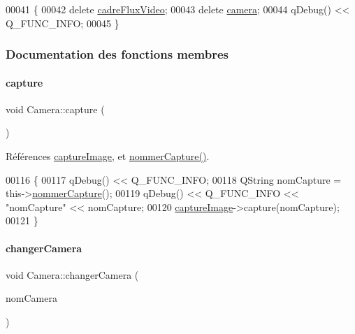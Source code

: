 \begin{DoxyCode}
00041 \{
00042     \textcolor{keyword}{delete} \hyperlink{class_camera_abf5fd38d19f0f06dfd7ec9e37f73adb8}{cadreFluxVideo};
00043     \textcolor{keyword}{delete} \hyperlink{class_camera_a282a199ddd33fe64bc27b32a55719054}{camera};
00044     qDebug() << Q\_FUNC\_INFO;
00045 \}
\end{DoxyCode}


\subsubsection{Documentation des fonctions membres}
\mbox{\label{class_camera_a3ca730dcbd7ea6bfba12931a15066f6c}} 
\paragraph{\texorpdfstring{capture}{capture}}
{\footnotesize\ttfamily void Camera\+::capture (\begin{DoxyParamCaption}{ }\end{DoxyParamCaption})\hspace{0.3cm}{\ttfamily [slot]}}



Références \hyperlink{class_camera_a482276c4fd0ba7172670006556322b62}{capture\+Image}, et \hyperlink{class_camera_a60d2c9f16b6f235ab6dd0360c883e0d0}{nommer\+Capture()}.


\begin{DoxyCode}
00116 \{
00117     qDebug() << Q\_FUNC\_INFO;
00118     QString nomCapture = this->\hyperlink{class_camera_a60d2c9f16b6f235ab6dd0360c883e0d0}{nommerCapture}();
00119     qDebug() << Q\_FUNC\_INFO << \textcolor{stringliteral}{"nomCapture"} << nomCapture;
00120     \hyperlink{class_camera_a482276c4fd0ba7172670006556322b62}{captureImage}->capture(nomCapture);
00121 \}
\end{DoxyCode}
\mbox{\label{class_camera_a82a0dd06f1802dc0ec0ea8ff6fcbd231}} 
\paragraph{\texorpdfstring{changer\+Camera}{changerCamera}}
{\footnotesize\ttfamily void Camera\+::changer\+Camera (\begin{DoxyParamCaption}\item[{Q\+String}]{nom\+Camera }\end{DoxyParamCaption})\hspace{0.3cm}{\ttfamily [slot]}}


